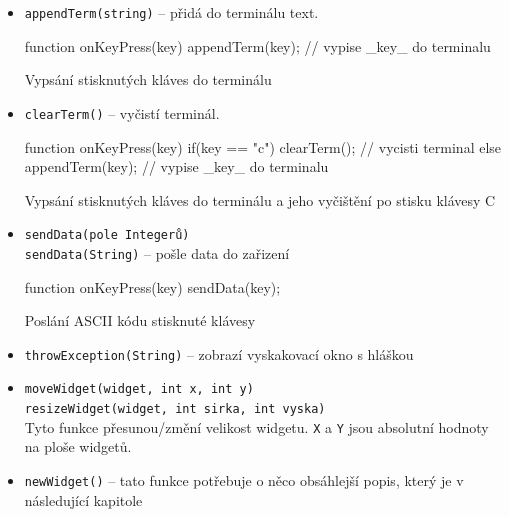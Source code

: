 \documentclass[12pt, a4paper, oneside]{article}
\begin{document}
\begin{itemize}
    \item {\color{blue}\verb/appendTerm(string)/} -- přidá do terminálu text.\\
        \begin{listing}[H]
        \begin{jscode}
function onKeyPress(key) {
    appendTerm(key); // vypise _key_ do terminalu
}
        \end{jscode}
        \caption{Vypsání stisknutých kláves do terminálu}
        \end{listing}

    \item {\color{blue}\verb/clearTerm()/} -- vyčistí terminál.\\
        \begin{listing}[H]
        \begin{jscode}
function onKeyPress(key) {
    if(key == "c")
        clearTerm(); // vycisti terminal
    else
        appendTerm(key); // vypise _key_ do terminalu
}
        \end{jscode}
        \caption{Vypsání stisknutých kláves do terminálu a jeho vyčištění po stisku klávesy C}
        \end{listing}

    \item {\color{blue}\verb/sendData(pole Integerů)/} \\
         {\color{blue}\verb/sendData(String)/} -- pošle data do zařizení\\
        \begin{listing}[H]
        \begin{jscode}
function onKeyPress(key) {
    sendData(key);
}
        \end{jscode}
        \caption{Poslání ASCII kódu stisknuté klávesy}
        \end{listing}

    \item {\color{blue}\verb/throwException(String)/} -- zobrazí vyskakovací okno s hláškou

    \item {\color{blue}\verb/moveWidget(widget, int x, int y)/} \\
    {\color{blue}\verb/resizeWidget(widget, int sirka, int vyska)/} \\
        Tyto funkce přesunou/změní velikost widgetu. \verb|X| a \verb|Y| jsou absolutní hodnoty na ploše widgetů.

    \item {\color{blue}\verb/newWidget()/} -- tato funkce potřebuje o něco obsáhlejší popis, který je v následující kapitole
\end{itemize}
\end{document}
